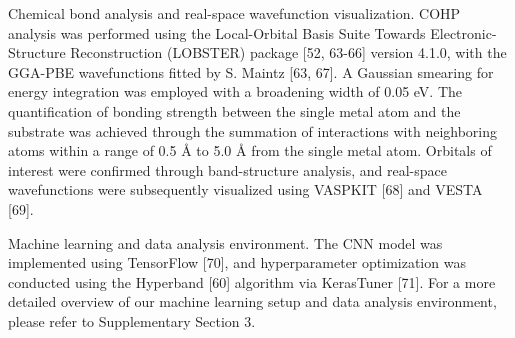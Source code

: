 Chemical bond analysis and real-space wavefunction visualization.
COHP analysis was performed using the Local-Orbital Basis Suite Towards Electronic-Structure Reconstruction (LOBSTER) package  [52, 63-66] version 4.1.0, with the GGA-PBE wavefunctions fitted by S. Maintz [63, 67]. A Gaussian smearing for energy integration was employed with a broadening width of 0.05 eV. The quantification of bonding strength between the single metal atom and the substrate was achieved through the summation of interactions with neighboring atoms within a range of 0.5 Å to 5.0 Å from the single metal atom. Orbitals of interest were confirmed through band-structure analysis, and real-space wavefunctions were subsequently visualized using VASPKIT [68] and VESTA [69].


Machine learning and data analysis environment.
The CNN model was implemented using TensorFlow [70], and hyperparameter optimization was conducted using the Hyperband [60] algorithm via KerasTuner [71]. For a more detailed overview of our machine learning setup and data analysis environment, please refer to Supplementary Section 3.
